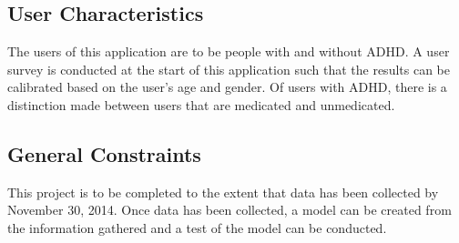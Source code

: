 \documentclass[a4wide]{article}
\begin{document}
\subsection{User Characteristics}

The users of this application are to be people with and without ADHD. A user
survey is conducted at the start of this application such that the results can
be calibrated based on the user's age and gender. Of users with ADHD, there is a
distinction made between users that are medicated and unmedicated.

\subsection{General Constraints}

This project is to be completed to the extent that data has been collected by
November 30, 2014. Once data has been collected, a model can be created from the
information gathered and a test of the model can be conducted.


\end{document}
